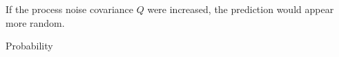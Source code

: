 If the process noise covariance $Q$ were increased, the prediction would appear more random. 






Probability 



